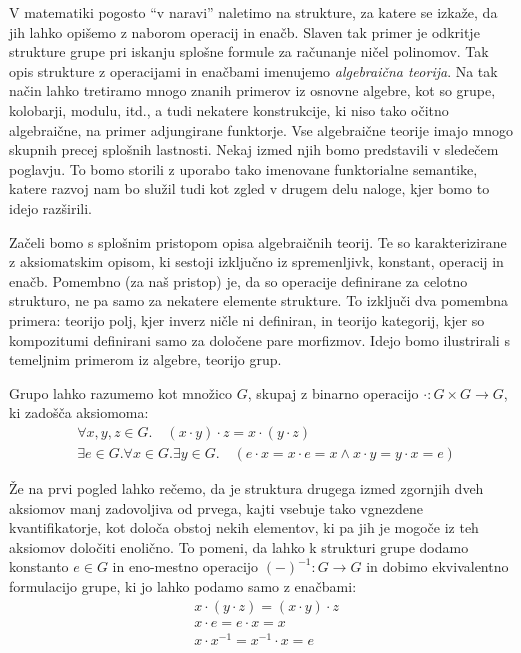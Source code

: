 \documentclass[../kategoricna_logika.tex]{subfiles}
\begin{document}
V matematiki pogosto ``v naravi'' naletimo na strukture, za katere se izkaže,
da jih lahko opišemo z naborom operacij in enačb.
Slaven tak primer je odkritje strukture grupe pri iskanju splošne formule
za računanje ničel polinomov.
Tak opis strukture z operacijami in enačbami imenujemo \emph{algebraična teorija}.
Na tak način lahko tretiramo mnogo znanih primerov iz osnovne algebre,
kot so grupe, kolobarji, modulu, itd., a tudi nekatere konstrukcije, ki niso
tako očitno algebraične, na primer adjungirane funktorje.
Vse algebraične teorije imajo mnogo skupnih precej splošnih lastnosti.
Nekaj izmed njih bomo predstavili v sledečem poglavju.
To bomo storili z uporabo tako imenovane funktorialne semantike, katere
razvoj nam bo služil tudi kot zgled v drugem delu naloge, kjer bomo to
idejo razširili.

Začeli bomo s splošnim pristopom opisa algebraičnih teorij.
Te so karakterizirane z aksiomatskim opisom, ki sestoji izključno iz
spremenljivk, konstant, operacij in enačb. Pomembno (za naš pristop) je,
da so operacije definirane za celotno strukturo, ne pa samo za nekatere
elemente strukture. To izključi dva pomembna primera: teorijo polj,
kjer inverz ničle ni definiran, in teorijo kategorij, kjer so kompozitumi
definirani samo za določene pare morfizmov.
Idejo bomo ilustrirali s temeljnim primerom iz algebre, teorijo grup.
\begin{primer}
  \label{primer:teorija-grup}
  Grupo lahko razumemo kot množico $G$, skupaj z binarno operacijo
  $\cdot : G \times G \to G$, ki zadošča aksiomoma:
  \begin{align}\label{aksiomi-grupe}
    &\forall x,y,z \in G . \quad (x\cdot y) \cdot z = x \cdot (y \cdot z) \\
    &\exists e \in G . \forall x \in G . \exists y \in G . \quad (e \cdot x = x \cdot e = x \wedge x \cdot y = y \cdot x = e)
  \end{align}
\end{primer}
Že na prvi pogled lahko rečemo, da je struktura drugega izmed zgornjih dveh aksiomov
manj zadovoljiva od prvega, kajti vsebuje tako vgnezdene kvantifikatorje,
kot določa obstoj nekih elementov, ki pa jih je mogoče iz teh aksiomov
določiti enolično. To pomeni, da lahko k strukturi grupe dodamo
konstanto $e \in G$ in eno-mestno operacijo $(-)^{-1} : G \to G$ in
dobimo ekvivalentno formulacijo grupe, ki jo lahko podamo samo z enačbami:
\begin{align*}
  &x \cdot (y \cdot z) = (x \cdot y) \cdot z \\
  &x \cdot e = e \cdot x = x \\
  &x \cdot x^{-1} = x^{-1} \cdot x = e
\end{align*}
\end{document}
